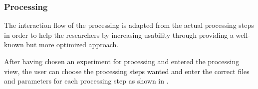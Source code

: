 \subsubsection{Processing}
The interaction flow of the processing is adapted from the actual processing 
steps in order to help the researchers by increasing usability through providing
a well-known but more optimized approach.

After having chosen an experiment for processing and entered the processing 
view, the user can choose the processing steps wanted and enter the correct
files and parameters for each processing step as shown in .
